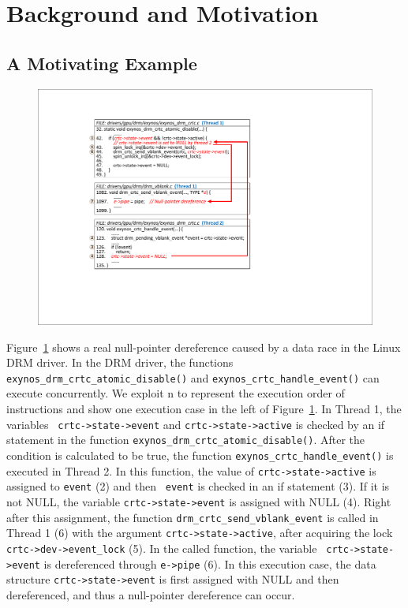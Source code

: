 \section{Background and Motivation}
\label{sec_motivation}

\subsection{A Motivating Example}
\label{subsec_motivating_example}

\begin{figure}[htbp]
	\centering
	\includegraphics[width=1\linewidth]{figures/fig_bug_demo.pdf}
	\label{fig_bug_demo}
\end{figure}
Figure~\ref{fig_bug_demo} shows a real null-pointer dereference caused by a 
data race in the Linux DRM driver. In the DRM driver, the functions {\tt 
exynos\_drm\_crtc\_atomic\_disable()} and {\tt exynos\_crtc\_handle\_event()} 
can execute concurrently. We exploit \textcircled{\footnotesize{n}} to 
represent the execution order of instructions and show one execution case in 
the left of Figure~\ref{fig_bug_demo}. In Thread 1, the variables {\tt 
crtc->state->event} and {\tt crtc->state->active} is checked by an if statement 
in the function {\tt exynos\_drm\_crtc\_atomic\_disable()}. After the condition 
is calculated to be true, the function {\tt exynos\_crtc\_handle\_event()} is 
executed in Thread 2. In this function, the value of {\tt crtc->state->active} 
is assigned to {\tt event} (\textcircled{\footnotesize{2}}) and then {\tt 
event} is checked in an if statement (\textcircled{\footnotesize{3}}). If it is 
not NULL, the variable {\tt crtc->state->event} is assigned with NULL 
(\textcircled{\footnotesize{4}}). Right after this assignment, the function 
{\tt drm\_crtc\_send\_vblank\_event} is called  in Thread 1 
(\textcircled{\footnotesize{6}}) with the argument {\tt crtc->state->active}, 
after acquiring the lock {\tt crtc->dev->event\_lock} 
(\textcircled{\footnotesize{5}}). In the called function, the variable {\tt 
crtc->state->event} is dereferenced through {\tt e->pipe} 
(\textcircled{\footnotesize{6}}). In this execution case, the data structure 
{\tt crtc->state->event} is first assigned with NULL and then dereferenced, and 
thus a null-pointer dereference can occur.

